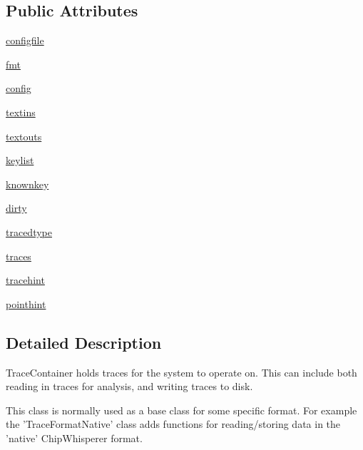 \subsection*{Public Attributes}
\begin{DoxyCompactItemize}
\item 
\hyperlink{classsoftware_1_1chipwhisperer_1_1common_1_1traces_1_1__base_1_1TraceContainer_a9dbd1f233cc1555571efa0aada83f863}{configfile}
\item 
\hyperlink{classsoftware_1_1chipwhisperer_1_1common_1_1traces_1_1__base_1_1TraceContainer_a6e1bd3471c3ac501e40159bfd63c3607}{fmt}
\item 
\hyperlink{classsoftware_1_1chipwhisperer_1_1common_1_1traces_1_1__base_1_1TraceContainer_a91b28c5692513860c2c5a6f920958ede}{config}
\item 
\hyperlink{classsoftware_1_1chipwhisperer_1_1common_1_1traces_1_1__base_1_1TraceContainer_a3cae69df92363a7d0740827d18e62ce2}{textins}
\item 
\hyperlink{classsoftware_1_1chipwhisperer_1_1common_1_1traces_1_1__base_1_1TraceContainer_ab0bd9d68c32f5c0e0d54a9fa34f18c4f}{textouts}
\item 
\hyperlink{classsoftware_1_1chipwhisperer_1_1common_1_1traces_1_1__base_1_1TraceContainer_af0dba15ea361e9e3dfe9fb93a9af81f9}{keylist}
\item 
\hyperlink{classsoftware_1_1chipwhisperer_1_1common_1_1traces_1_1__base_1_1TraceContainer_aff5b1978e8681de9c0c876ca47621e3c}{knownkey}
\item 
\hyperlink{classsoftware_1_1chipwhisperer_1_1common_1_1traces_1_1__base_1_1TraceContainer_a5829014f02d4f6aff1dfc8a234189641}{dirty}
\item 
\hyperlink{classsoftware_1_1chipwhisperer_1_1common_1_1traces_1_1__base_1_1TraceContainer_a05023d9e7baaaf1474c3ec3dddbcefa8}{tracedtype}
\item 
\hyperlink{classsoftware_1_1chipwhisperer_1_1common_1_1traces_1_1__base_1_1TraceContainer_ab5f9bde012609ff3df778893a84c21e8}{traces}
\item 
\hyperlink{classsoftware_1_1chipwhisperer_1_1common_1_1traces_1_1__base_1_1TraceContainer_af61441b531bf863d5fa8bc9bd250a439}{tracehint}
\item 
\hyperlink{classsoftware_1_1chipwhisperer_1_1common_1_1traces_1_1__base_1_1TraceContainer_a6385d276065704b43e1d7867098a235c}{pointhint}
\end{DoxyCompactItemize}


\subsection{Detailed Description}
\begin{DoxyVerb}TraceContainer holds traces for the system to operate on. This can include both reading in traces for analysis, and
writing traces to disk.

This class is normally used as a base class for some specific format. For example the 'TraceFormatNative' class
adds functions for reading/storing data in the 'native' ChipWhisperer format.
\end{DoxyVerb}
 

